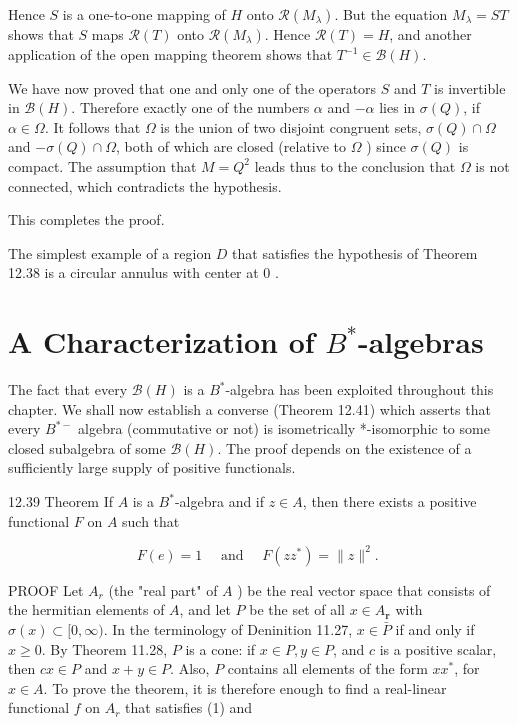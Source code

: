 \documentclass[10pt]{article}
\begin{document}
Hence $S$ is a one-to-one mapping of $H$ onto $\mathscr{R}\left(M_{\lambda}\right)$. But the equation $M_{\lambda}=S T$ shows that $S$ maps $\mathscr{R}(T)$ onto $\mathscr{R}\left(M_{\lambda}\right)$. Hence $\mathscr{R}(T)=H$, and another application of the open mapping theorem shows that $T^{-1} \in \mathscr{B}(H)$.

We have now proved that one and only one of the operators $S$ and $T$ is invertible in $\mathscr{B}(H)$. Therefore exactly one of the numbers $\alpha$ and $-\alpha$ lies in $\sigma(Q)$, if $\alpha \in \Omega$. It follows that $\Omega$ is the union of two disjoint congruent sets, $\sigma(Q) \cap \Omega$ and $-\sigma(Q) \cap \Omega$, both of which are closed (relative to $\Omega$ ) since $\sigma(Q)$ is compact. The assumption that $M=Q^{2}$ leads thus to the conclusion that $\Omega$ is not connected, which contradicts the hypothesis.

This completes the proof.

The simplest example of a region $D$ that satisfies the hypothesis of Theorem 12.38 is a circular annulus with center at 0 .

\section{A Characterization of $B^{*}$-algebras}
The fact that every $\mathscr{B}(H)$ is a $B^{*}$-algebra has been exploited throughout this chapter. We shall now establish a converse (Theorem 12.41) which asserts that every $B^{*-}$ algebra (commutative or not) is isometrically *-isomorphic to some closed subalgebra of some $\mathscr{B}(H)$. The proof depends on the existence of a sufficiently large supply of positive functionals.

12.39 Theorem If $A$ is a $B^{*}$-algebra and if $z \in A$, then there exists a positive functional $F$ on $A$ such that

$$
F(e)=1 \quad \text { and } \quad F\left(z z^{*}\right)=\|z\|^{2} \text {. }
$$

PROOF Let $A_{r}$ (the "real part" of $A$ ) be the real vector space that consists of the hermitian elements of $A$, and let $P$ be the set of all $x \in A_{\boldsymbol{r}}$ with $\sigma(x) \subset[0, \infty)$. In the terminology of Deninition 11.27, $x \in \bar{P}$ if and only if $x \geq 0$. By Theorem 11.28, $P$ is a cone: if $x \in P, y \in P$, and $c$ is a positive scalar, then $c x \in P$ and $x+y \in P$. Also, $P$ contains all elements of the form $x x^{*}$, for $x \in A$. To prove the theorem, it is therefore enough to find a real-linear functional $f$ on $A_{r}$ that satisfies (1) and
\end{document}
